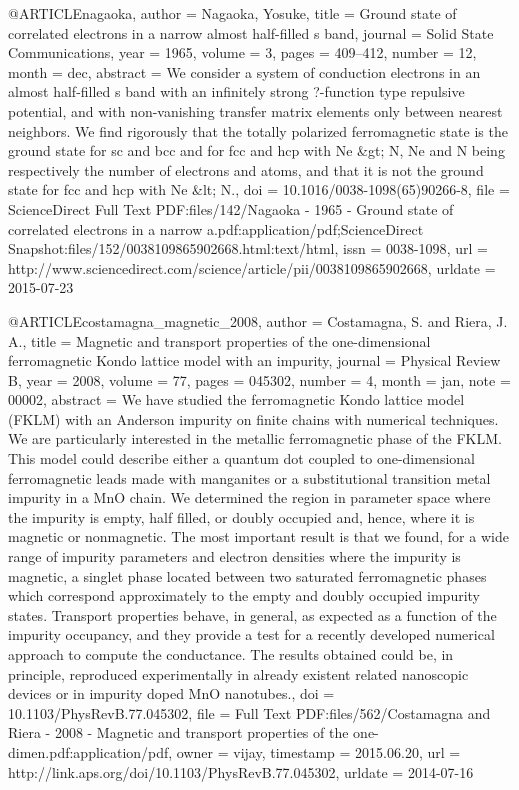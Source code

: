 @ARTICLE{nagaoka,
  author = {Nagaoka, Yosuke},
  title = {Ground state of correlated electrons in a narrow almost half-filled
	s band},
  journal = {Solid State Communications},
  year = {1965},
  volume = {3},
  pages = {409--412},
  number = {12},
  month = dec,
  abstract = {We consider a system of conduction electrons in an almost half-filled
	s band with an infinitely strong ?-function type repulsive potential,
	and with non-vanishing transfer matrix elements only between nearest
	neighbors. We find rigorously that the totally polarized ferromagnetic
	state is the ground state for sc and bcc and for fcc and hcp with
	Ne \&gt; N, Ne and N being respectively the number of electrons and
	atoms, and that it is not the ground state for fcc and hcp with Ne
	\&lt; N.},
  doi = {10.1016/0038-1098(65)90266-8},
  file = {ScienceDirect Full Text PDF:files/142/Nagaoka - 1965 - Ground state of correlated electrons   in a narrow a.pdf:application/pdf;ScienceDirect Snapshot:files/152/0038109865902668.html:text/html},
  issn = {0038-1098},
  url = {http://www.sciencedirect.com/science/article/pii/0038109865902668},
  urldate = {2015-07-23}
}

@ARTICLE{costamagna_magnetic_2008,
  author = {Costamagna, S. and Riera, J. A.},
  title = {Magnetic and transport properties of the one-dimensional ferromagnetic
	{Kondo} lattice model with an impurity},
  journal = {Physical Review B},
  year = {2008},
  volume = {77},
  pages = {045302},
  number = {4},
  month = jan,
  note = {00002},
  abstract = {We have studied the ferromagnetic Kondo lattice model (FKLM) with
	an Anderson impurity on finite chains with numerical techniques.
	We are particularly interested in the metallic ferromagnetic phase
	of the FKLM. This model could describe either a quantum dot coupled
	to one-dimensional ferromagnetic leads made with manganites or a
	substitutional transition metal impurity in a MnO chain. We determined
	the region in parameter space where the impurity is empty, half filled,
	or doubly occupied and, hence, where it is magnetic or nonmagnetic.
	The most important result is that we found, for a wide range of impurity
	parameters and electron densities where the impurity is magnetic,
	a singlet phase located between two saturated ferromagnetic phases
	which correspond approximately to the empty and doubly occupied impurity
	states. Transport properties behave, in general, as expected as a
	function of the impurity occupancy, and they provide a test for a
	recently developed numerical approach to compute the conductance.
	The results obtained could be, in principle, reproduced experimentally
	in already existent related nanoscopic devices or in impurity doped
	MnO nanotubes.},
  doi = {10.1103/PhysRevB.77.045302},
  file = {Full Text PDF:files/562/Costamagna and Riera - 2008 - Magnetic and transport properties of the one-dimen.pdf:application/pdf},
  owner = {vijay},
  timestamp = {2015.06.20},
  url = {http://link.aps.org/doi/10.1103/PhysRevB.77.045302},
  urldate = {2014-07-16}
}

